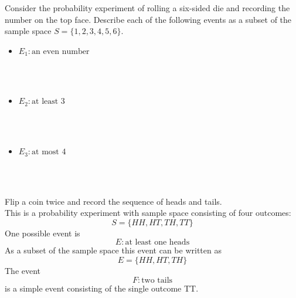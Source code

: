 \documentclass[handout]{ximera}
\begin{document}
	\begin{problem}
	Consider the probability experiment of rolling a six-sided die and recording the number on the top face. Describe each of the following events as a subset of the sample space $S = \{1, 2, 3, 4, 5, 6\}$.\\
	\begin{itemize}
	\item $E_1: \mbox{an even number}$
	\begin{multipleChoice}
	\\
	\\
	\end{multipleChoice}
	
	\item $E_2: \mbox{at least 3}$
	\begin{multipleChoice}
	\\
	\\
	\choice[correct]{$E_2 = \{3, 4, 5, 6\}$}
	\end{multipleChoice}
	
	\item $E_3: \mbox{at most 4}$
	\begin{multipleChoice}
	\\
	\\
	\choice{$E_3 = \{1, 4\}$}
	\end{multipleChoice}
	\end{itemize}
	\end{problem}
	
	
	
	\begin{example}
	Flip a coin twice and record the sequence of heads and tails.\\
	This is a probability experiment with sample space consisting of four outcomes:
	\[
	S = \{HH, HT, TH, TT\}
	\]
	One possible event is
	\[
	E: \mbox{at least one heads}
	\]
	As a subset of the sample space this event can be written as
	\[
	E = \{HH, HT, TH\}
	\]
	The event
	\[
	F: \mbox{two tails}
	\]
	is a simple event consisting of the single outcome TT.
	
	\end{example}
	
\end{document}

